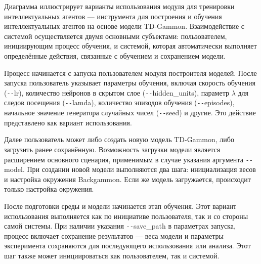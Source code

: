 Диаграмма  иллюстрирует варианты использования модуля для тренировки интеллектуальных агентов --- инструмента для построения и обучения интеллектуальных агентов на основе модели TD-Gammon. Взаимодействие с системой осуществляется двумя основными субъектами: пользователем, инициирующим процесс обучения, и системой, которая автоматически выполняет определённые действия, связанные с обучением и сохранением модели.


Процесс начинается с запуска пользователем модуля построителя моделей. После запуска пользователь указывает параметры обучения, включая скорость обучения (\texttt{-{}-}lr), количество нейронов в скрытом слое (\texttt{-{}-}hidden\_units), параметр $\lambda$ для следов посещения (\texttt{-{}-}lamda), количество эпизодов обучения (\texttt{-{}-}episodes), начальное значение генератора случайных чисел (\texttt{-{}-}seed) и другие. Это действие представлено как вариант использования.

Далее пользователь может либо создать новую модель TD-Gammon, либо загрузить ранее сохранённую. Возможность загрузки модели является расширением основного сценария, применимым в случае указания аргумента \texttt{-{}-}model. При создании новой модели выполняются два шага: инициализация весов и настройка окружения Backgammon. Если же модель загружается, происходит только настройка окружения.

После подготовки среды и модели начинается этап обучения. Этот вариант использования выполняется как по инициативе пользователя, так и со стороны самой системы. При наличии указания \texttt{-{}-}save\_path в параметрах запуска, процесс включает сохранение результатов --- веса модели и параметры эксперимента сохраняются для последующего использования или анализа. Этот шаг также может инициироваться как пользователем, так и системой.

